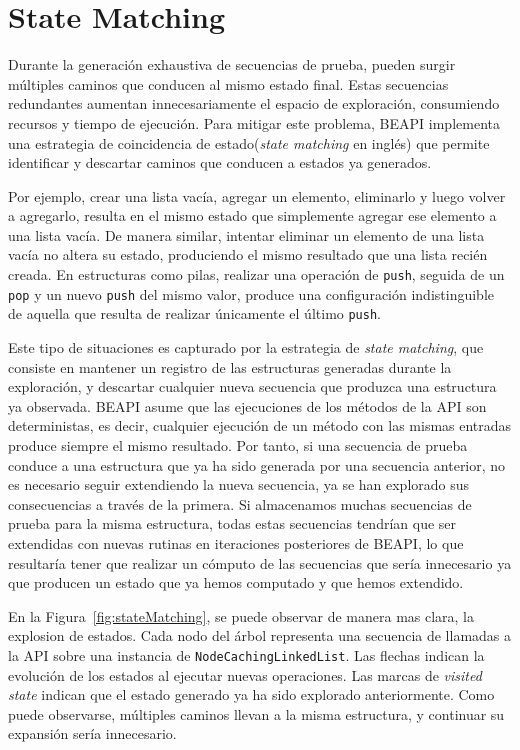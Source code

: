 \section{State Matching}
\label{sec:stateMatching}
Durante la generación exhaustiva de secuencias de prueba, pueden surgir múltiples caminos que conducen al mismo estado final. 
Estas secuencias redundantes aumentan innecesariamente el espacio de exploración, consumiendo recursos y tiempo de ejecución. 
Para mitigar este problema, \textsf{BEAPI} implementa una estrategia de coincidencia de estado(\emph{state matching} en inglés) que permite identificar y descartar caminos que conducen a estados ya generados.

Por ejemplo, crear una lista vacía, agregar un elemento, eliminarlo y luego volver a agregarlo, resulta en el mismo estado que simplemente agregar ese elemento a una lista vacía. 
De manera similar, intentar eliminar un elemento de una lista vacía no altera su estado, produciendo el mismo resultado que una lista recién creada. 
En estructuras como pilas, realizar una operación de \texttt{push}, seguida de un \texttt{pop} y un nuevo \texttt{push} del mismo valor, 
produce una configuración indistinguible de aquella que resulta de realizar únicamente el último \texttt{push}. 

Este tipo de situaciones es capturado por la estrategia de \emph{state matching}, que consiste en mantener un registro de las estructuras generadas durante la exploración, y descartar cualquier nueva secuencia que produzca una estructura ya observada. 
\textsf{BEAPI} asume que las ejecuciones de los métodos de la API son deterministas, es decir, cualquier ejecución de un método con las mismas entradas produce siempre el mismo resultado. 
Por tanto, si una secuencia de prueba conduce a una estructura que ya ha sido generada por una secuencia anterior, no es necesario seguir extendiendo la nueva secuencia, 
ya se han explorado sus consecuencias a través de la primera.
Si almacenamos muchas secuencias de prueba para la misma estructura, todas estas secuencias tendrían que ser extendidas con nuevas rutinas en iteraciones posteriores de \textsf{BEAPI}, 
lo que resultaría tener que realizar un cómputo de las secuencias que sería innecesario ya que producen un estado que ya hemos computado y que hemos extendido.  

En la Figura~\ref{fig:stateMatching}, se puede observar de manera mas clara, la explosion de estados. 
Cada nodo del árbol representa una secuencia de llamadas a la API sobre una instancia de \texttt{NodeCachingLinkedList}. 
Las flechas indican la evolución de los estados al ejecutar nuevas operaciones. 
Las marcas de \emph{visited state}  indican que el estado generado ya ha sido explorado anteriormente. 
Como puede observarse, múltiples caminos llevan a la misma estructura, y continuar su expansión sería innecesario.

